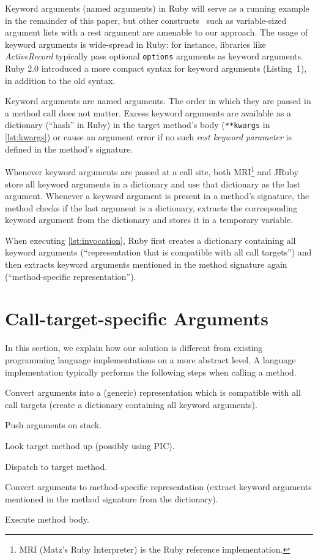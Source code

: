 \documentclass[10pt]{sigplanconf}
\begin{document}
Keyword arguments (named arguments) in Ruby will serve as a running example in the remainder of this paper, but other constructs~\cite{Zdun05patternsof} such as variable-sized argument lists with a rest argument are amenable to our approach. The usage of keyword arguments is wide-spread in Ruby: for instance, libraries like \emph{ActiveRecord} typically pass optional \lstinline{options} arguments as keyword arguments. Ruby 2.0 introduced a more compact syntax for keyword arguments (Listing~1), in addition to the old syntax. 

Keyword arguments are named arguments. The order in which they are passed in a method call does not matter. Excess keyword arguments are available as a dictionary (``hash'' in Ruby) in the target method's body (\lstinline{**kwargs} in \autoref{lst:kwargs}) or cause an argument error if no such \emph{rest keyword parameter} is defined in the method's signature.

Whenever keyword arguments are passed at a call site, both MRI\footnote{MRI (Matz's Ruby Interpreter) is the Ruby reference implementation.} and JRuby store all keyword arguments in a dictionary and use that dictionary as the last argument. Whenever a keyword argument is present in a method's signature, the method checks if the last argument is a dictionary, extracts the corresponding keyword argument from the dictionary and stores it in a temporary variable.

When executing \autoref{lst:invocation}, Ruby first creates a dictionary containing all keyword arguments (``representation that is compatible with all call targets'') and then extracts keyword arguments mentioned in the method signature again (``method-specific representation'').


\section{Call-target-specific Arguments}
In this section, we explain how our solution is different from existing programming language implementations on a more abstract level. A language implementation typically performs the following steps when calling a method.

\begin{Compactenum}
       \item Convert arguments into a (generic) representation which is compatible with all call targets (\eg create a dictionary containing all keyword arguments).
       \item Push arguments on stack.
       \item Look target method up (possibly using PIC).
       \item Dispatch to target method.
       \item Convert arguments to method-specific representation (\eg extract keyword arguments mentioned in the method signature from the dictionary).
       \item Execute method body.
\end{Compactenum}
\end{document}
